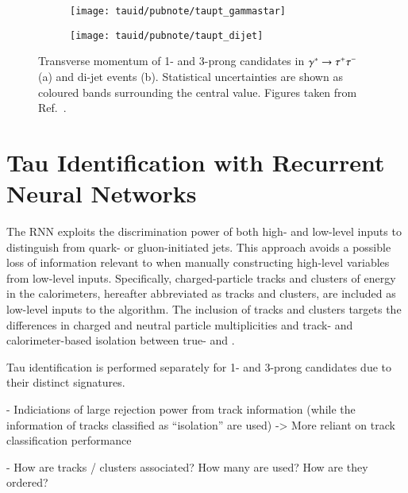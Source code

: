 \begin{figure}[htbp]
  \begin{subfigure}{0.498\textwidth}
    \texttt{[image: tauid/pubnote/taupt\_gammastar]}
    \label{fig:tauid_candidate_pt_gammastar}
  \end{subfigure}\hfill%
  \begin{subfigure}{0.498\textwidth}
    \texttt{[image: tauid/pubnote/taupt\_dijet]}
    \label{fig:tauid_candidate_pt_dijet}
  \end{subfigure}

  \caption{Transverse momentum of 1- and 3-prong \tauhadvis candidates
    in $\gamma^{*} \to \tau^{+} \tau^{-}$ (a) and di-jet events (b). Statistical
    uncertainties are shown as coloured bands surrounding the central
    value. Figures taken from Ref.~\cite{ATL-PHYS-PUB-2019-033}.}%
  \label{fig:tauid_candidate_pt}
\end{figure}


\section{Tau Identification with Recurrent Neural Networks}%
\label{sec:tauid_rnn}

The RNN \tauid exploits the discrimination power of both high- and
low-level inputs to distinguish \tauhad from quark- or gluon-initiated
jets. This approach avoids a possible loss of information relevant to
\tauid when manually constructing high-level variables from low-level
inputs. Specifically, charged-particle tracks and clusters of energy
in the calorimeters, hereafter abbreviated as tracks and clusters, are
included as low-level inputs to the algorithm. The inclusion of tracks
and clusters targets the differences in charged and neutral particle
multiplicities and track- and calorimeter-based isolation between
true- and \faketauhadvis.

Tau identification is performed separately for 1- and 3-prong
\tauhadvis candidates due to their distinct signatures.

- Indiciations of large rejection power from track information (while
the information of tracks classified as ``isolation'' are used) ->
More reliant on track classification performance

- How are tracks / clusters associated? How many are used? How are they ordered?


